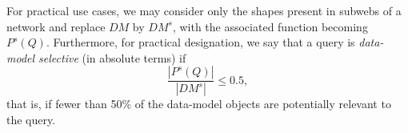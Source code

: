 For practical use cases, we may consider only the shapes present in subwebs of a network and replace $DM$ by $DM^s$,
with the associated function becoming $P^s(Q)$.
Furthermore, for practical designation, we say that a query is \emph{data-model selective} (in absolute terms) if 
\begin{equation}
    \frac{\left| P^s(Q) \right|}{\left| DM^s \right|} \leq 0.5,
\end{equation}
that is, if fewer than 50\% of the data-model objects are potentially relevant to the query.

